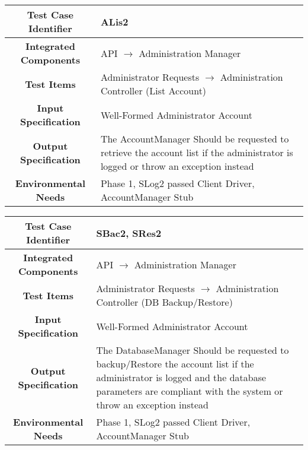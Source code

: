 \documentclass[11pt, a4paper,titlepage]{article}
\begin{document}
 		 \begin{tabularx}{\textwidth}{| c|X|}
	 		 	\hline \textbf{Test Case Identifier} & ALis2 \\
	 		 	\hline \textbf{Integrated Components} &  API $\rightarrow $ Administration Manager \\
	 		 	\hline \textbf{Test Items} &  Administrator Requests  $\rightarrow $ Administration Controller (List Account)\\
	 		 	\hline \textbf{Input Specification} &  Well-Formed Administrator Account\\
	 		 	\hline \textbf{Output Specification} & The AccountManager Should be requested to retrieve the account list if the administrator is logged or throw an exception instead\\
	 		 	\hline \textbf{Environmental Needs} &  Phase 1, SLog2 passed \newline 
	 		 	Client Driver, AccountManager Stub\\
	 		 	\hline
 		 \end{tabularx}
 		 \newline
		 
		  \begin{tabularx}{\textwidth}{| c|X|}
		  	\hline \textbf{Test Case Identifier} & SBac2, SRes2 \\
		  	\hline \textbf{Integrated Components} &  API $\rightarrow $ Administration Manager \\
		  	\hline \textbf{Test Items} &  Administrator Requests  $\rightarrow $ Administration Controller (DB Backup/Restore)\\
		  	\hline \textbf{Input Specification} &  Well-Formed Administrator Account\\
		  	\hline \textbf{Output Specification} & The DatabaseManager Should be requested to backup/Restore the account list if the administrator is logged and the database parameters are compliant with the system or throw an exception instead\\
		  	\hline \textbf{Environmental Needs} &  Phase 1, SLog2 passed \newline 
		  	Client Driver, AccountManager Stub\\
		  	\hline
		  \end{tabularx}
		  \newline
		  
\end{document}

